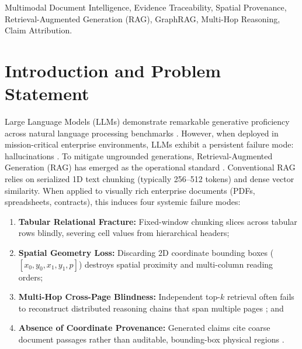 \documentclass[conference,a4paper]{IEEEtran}
\begin{document}
\begin{IEEEkeywords}
Multimodal Document Intelligence, Evidence Traceability, Spatial Provenance, Retrieval-Augmented Generation (RAG), GraphRAG, Multi-Hop Reasoning, Claim Attribution.
\end{IEEEkeywords}

\section{Introduction and Problem Statement}
Large Language Models (LLMs) demonstrate remarkable generative proficiency across natural language processing benchmarks \cite{brown2020}. However, when deployed in mission-critical enterprise environments, LLMs exhibit a persistent failure mode: hallucinations \cite{ji2023}. To mitigate ungrounded generations, Retrieval-Augmented Generation (RAG) has emerged as the operational standard \cite{lewis2020, guu2020}. Conventional RAG relies on serialized 1D text chunking (typically 256--512 tokens) and dense vector similarity. When applied to visually rich enterprise documents (PDFs, spreadsheets, contracts), this induces four systemic failure modes:
\begin{enumerate}
    \item[(a)] \textbf{Tabular Relational Fracture:} Fixed-window chunking slices across tabular rows blindly, severing cell values from hierarchical headers;
    \item[(b)] \textbf{Spatial Geometry Loss:} Discarding 2D coordinate bounding boxes ($[x_0, y_0, x_1, y_1, p]$) destroys spatial proximity and multi-column reading orders;
    \item[(c)] \textbf{Multi-Hop Cross-Page Blindness:} Independent top-$k$ retrieval often fails to reconstruct distributed reasoning chains that span multiple pages \cite{yang2018hotpotqa, trivedi2023}; and
    \item[(d)] \textbf{Absence of Coordinate Provenance:} Generated claims cite coarse document passages rather than auditable, bounding-box physical regions \cite{tripathi2026, yang2025adaptiveguard}.
\end{enumerate}
\end{document}
